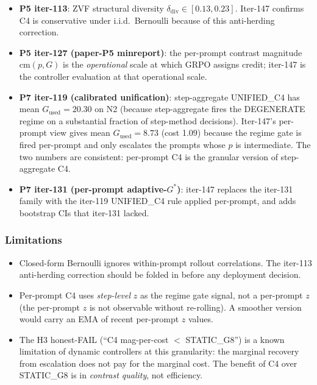 \documentclass{article}
\begin{document}
\begin{itemize}
\item \textbf{P5 iter-113}: ZVF structural diversity $\delta_{\mathrm{div}} \in [0.13, 0.23]$.
      Iter-147 confirms C4 is conservative under i.i.d.\ Bernoulli because of
      this anti-herding correction.
\item \textbf{P5 iter-127 (paper-P5 minreport)}: the per-prompt contrast magnitude
      $\mathrm{cm}(p, G)$ is the \emph{operational} scale at which GRPO assigns
      credit; iter-147 is the controller evaluation at that operational scale.
\item \textbf{P7 iter-119 (calibrated unification)}: step-aggregate UNIFIED\_C4
      has mean $G_{\mathrm{used}}=20.30$ on N2 (because step-aggregate fires
      the DEGENERATE regime on a substantial fraction of step-method decisions).
      Iter-147's per-prompt view gives mean $G_{\mathrm{used}}=8.73$ (cost 1.09)
      because the regime gate is fired per-prompt and only escalates the prompts
      whose $\hat p$ is intermediate. The two numbers are consistent: per-prompt
      C4 is the granular version of step-aggregate C4.
\item \textbf{P7 iter-131 (per-prompt adaptive-$G^*$)}: iter-147 replaces the
      iter-131 family with the iter-119 UNIFIED\_C4 rule applied per-prompt,
      and adds bootstrap CIs that iter-131 lacked.
\end{itemize}

\subsubsection*{Limitations}

\begin{itemize}
\item Closed-form Bernoulli ignores within-prompt rollout correlations. The
      iter-113 anti-herding correction should be folded in before any
      deployment decision.
\item Per-prompt C4 uses \emph{step-level} $z$ as the regime gate signal,
      not a per-prompt $z$ (the per-prompt $z$ is not observable without
      re-rolling). A smoother version would carry an EMA of recent
      per-prompt $z$ values.
\item The H3 honest-FAIL (``C4 mag-per-cost $<$ STATIC\_G8'') is a known
      limitation of dynamic controllers at this granularity: the marginal
      recovery from escalation does not pay for the marginal cost. The
      benefit of C4 over STATIC\_G8 is in \emph{contrast quality}, not
      efficiency.
\end{itemize}
\end{document}

